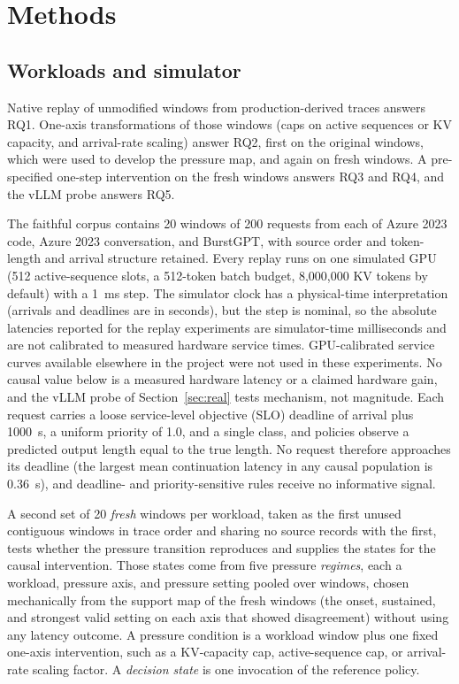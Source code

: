 \documentclass[preprint,12pt]{elsarticle}
\begin{document}
\section{Methods}
\label{sec:methods}

\subsection{Workloads and simulator}
\label{sec:workloads}
Native replay of unmodified windows from production-derived traces answers RQ1.
One-axis transformations of those windows (caps on active sequences or KV
capacity, and arrival-rate scaling) answer RQ2, first on the original windows,
which were used to develop the pressure map, and again on fresh windows. A
pre-specified one-step intervention on the fresh windows answers RQ3 and RQ4,
and the vLLM probe answers RQ5.

The faithful corpus contains 20 windows of 200 requests from each of Azure 2023
code, Azure 2023 conversation, and BurstGPT, with source order and token-length
and arrival structure retained. Every replay runs on one simulated GPU (512
active-sequence slots, a 512-token batch budget, 8,000,000 KV tokens by default)
with a 1~ms step. The simulator clock has a physical-time interpretation
(arrivals and deadlines are in seconds), but the step is nominal, so the absolute
latencies reported for the replay experiments are simulator-time milliseconds and
are not calibrated to measured hardware service times. GPU-calibrated service
curves available elsewhere in the project were not used in these experiments. No
causal value below is a measured hardware latency or a claimed hardware gain, and
the vLLM probe of Section~\ref{sec:real} tests mechanism, not magnitude. Each request carries a loose service-level objective (SLO) deadline
of arrival plus 1000~s, a uniform priority of 1.0, and a single class, and
policies observe a predicted output length equal to the true length. No request
therefore approaches its deadline (the largest mean continuation latency in any
causal population is 0.36~s), and deadline- and priority-sensitive rules receive
no informative signal.

A second set of 20 \emph{fresh} windows per workload, taken as the first unused
contiguous windows in trace order and sharing no source records with the first,
tests whether the pressure transition reproduces and supplies the states for the
causal intervention. Those states come from five pressure \emph{regimes}, each a
workload, pressure axis, and pressure setting pooled over windows, chosen
mechanically from the support map of the fresh windows (the onset, sustained,
and strongest valid setting on each axis that showed disagreement) without
using any latency outcome. A pressure condition is a workload window plus one
fixed one-axis intervention, such as a KV-capacity cap, active-sequence cap, or
arrival-rate scaling factor. A \emph{decision state} is one invocation of the
reference policy.
\end{document}
